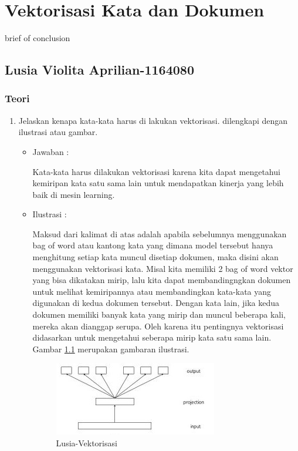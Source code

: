 \chapter{Vektorisasi Kata dan Dokumen}
brief of conclusion

\section{Lusia Violita Aprilian-1164080}

\subsection{Teori}

\begin{enumerate}

\item Jelaskan kenapa kata-kata harus di lakukan vektorisasi. dilengkapi dengan ilustrasi atau gambar.
	\begin{itemize}
	\item Jawaban :
		\par Kata-kata harus dilakukan vektorisasi karena kita dapat mengetahui kemiripan kata satu sama lain untuk mendapatkan kinerja yang lebih baik di mesin learning.
	\item Ilustrasi :
		\par Maksud dari kalimat di atas adalah  apabila sebelumnya menggunakan bag of word atau kantong kata yang dimana model tersebut hanya menghitung setiap kata muncul disetiap dokumen, maka disini akan menggunakan vektorisasi kata. Misal kita memiliki 2 bag of word vektor yang bisa dikatakan mirip, lalu kita dapat membandingngkan dokumen untuk melihat kemiripannya atau membandingkan kata-kata yang digunakan di kedua dokumen tersebut. Dengan kata lain, jika kedua dokumen memiliki banyak kata yang mirip dan muncul beberapa kali, mereka akan dianggap serupa.  Oleh karena itu pentingnya vektorisasi didasarkan untuk mengetahui seberapa mirip kata satu sama lain. Gambar \ref{5a1} merupakan gambaran ilustrasi.
		\begin{figure}[!hbtp]
		\centering
		\includegraphics[scale=0.5]{figures/p1.jpg}
		\caption{Lusia-Vektorisasi}
		\label{5a1}
		\end{figure}
	\end{itemize}


\end{enumerate}
